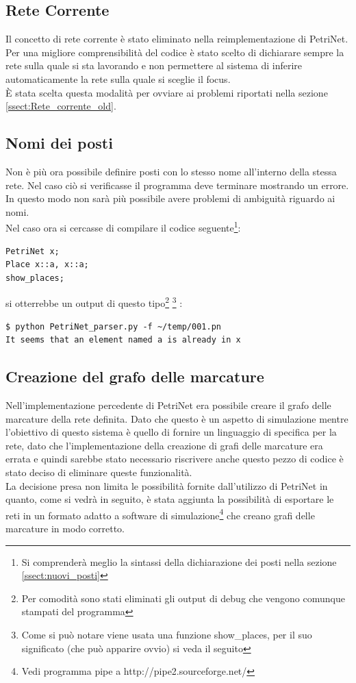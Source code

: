 \documentclass[italian,12pt]{book}
\begin{document}
\subsection{Rete Corrente}\label{ssect:rete_corrente_new}
Il concetto di rete corrente è stato eliminato nella reimplementazione di PetriNet. Per 
una migliore comprensibilità del codice è stato scelto di dichiarare sempre la rete sulla quale si 
sta lavorando e non permettere al sistema di inferire automaticamente la rete sulla quale 
si sceglie il focus.\\
È stata scelta questa modalità per ovviare ai problemi riportati nella sezione 
\ref{ssect:Rete_corrente_old}.

\subsection{Nomi dei posti}
Non è più ora possibile definire posti con lo stesso nome all'interno della stessa rete. Nel 
caso ciò si verificasse il programma deve terminare mostrando un errore. In questo modo non sarà 
più possibile avere problemi di ambiguità riguardo ai nomi.\\
Nel caso ora si cercasse di compilare il codice seguente\footnote{Si comprenderà meglio la sintassi della 
dichiarazione dei posti nella sezione \ref{ssect:nuovi_posti}}:
\begin{verbatim}PetriNet x;
Place x::a, x::a;
show_places;
\end{verbatim}
si otterrebbe un output di questo tipo\footnote{Per comodità sono stati eliminati gli output di 
debug che vengono comunque stampati del programma} \footnote{Come si può notare viene usata una 
funzione show\_places, per il suo significato (che può apparire ovvio) si veda il seguito} :
\begin{verbatim}
$ python PetriNet_parser.py -f ~/temp/001.pn 
It seems that an element named a is already in x
\end{verbatim}

\subsection{Creazione del grafo delle marcature}\label{ssect:creazione_grafo_marcature}
Nell'implementazione percedente di PetriNet era possibile creare il grafo delle 
marcature della rete definita. Dato che questo è un aspetto di simulazione mentre 
l'obiettivo di questo sistema è quello di fornire un linguaggio di specifica per la rete,
dato che l'implementazione della creazione di grafi delle marcature era errata e quindi
sarebbe stato necessario riscrivere anche questo pezzo di codice è stato deciso di 
eliminare queste funzionalità.\\
La decisione presa non limita le possibilità fornite dall'utilizzo di PetriNet in quanto, come
si vedrà in seguito, è stata aggiunta la possibilità di esportare le reti in un formato adatto a 
software di simulazione\footnote{Vedi programma pipe a http://pipe2.sourceforge.net/} che creano 
grafi delle marcature in modo corretto.
\end{document}
